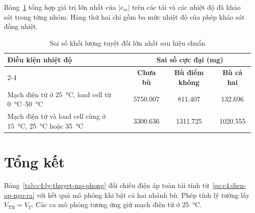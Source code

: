 Bảng~\ref{tab:c4:sai-so-cuc-dai} tổng hợp giá trị lớn nhất của
$\lvert e_m\rvert$ trên các tải và các nhiệt độ đã khảo sát trong từng
nhóm. Hàng thứ hai chỉ gồm ba mức nhiệt độ của phép khảo sát đồng nhiệt.

\begin{table}[H]
    \centering
    \caption{Sai số khối lượng tuyệt đối lớn nhất sau hiệu chuẩn}
    \label{tab:c4:sai-so-cuc-dai}
    \renewcommand{\arraystretch}{1.3}
    \begin{tabularx}{\textwidth}{|X|c|c|c|}
        \hline
        \textbf{Điều kiện nhiệt độ} &
        \multicolumn{3}{c|}{\textbf{Sai số cực đại (\unit{\milli\gram})}}
        \\ \cline{2-4}
        & \textbf{Chưa bù} & \textbf{Bù điểm không} &
        \textbf{Bù cả hai} \\ \hline
        Mạch điện tử ở \qty{25}{\celsius}, load cell từ
        \qtyrange{0}{50}{\celsius}
        & 5750.007 & 811.407 & 132.696 \\ \hline
        Mạch điện tử và load cell cùng ở \qty{15}{\celsius},
        \qty{25}{\celsius} hoặc \qty{35}{\celsius}
        & 3300.636 & 1311.725 & 1020.555 \\ \hline
    \end{tabularx}
\end{table}


\section{Tổng kết}
\label{sec:c4:tong-ket}

Bảng~\ref{tab:c4:ly-thuyet-mo-phong} đối chiếu điện áp toàn tải
tính từ~\eqref{eq:c4:dien-ap-ngo-ra} với kết quả mô phỏng khi bật
cả hai nhánh bù. Phép tính lý tưởng lấy $V_{\mathrm{TB}}=V_T$.
Các ca mô phỏng tương ứng giữ mạch điện tử ở \qty{25}{\celsius}.


